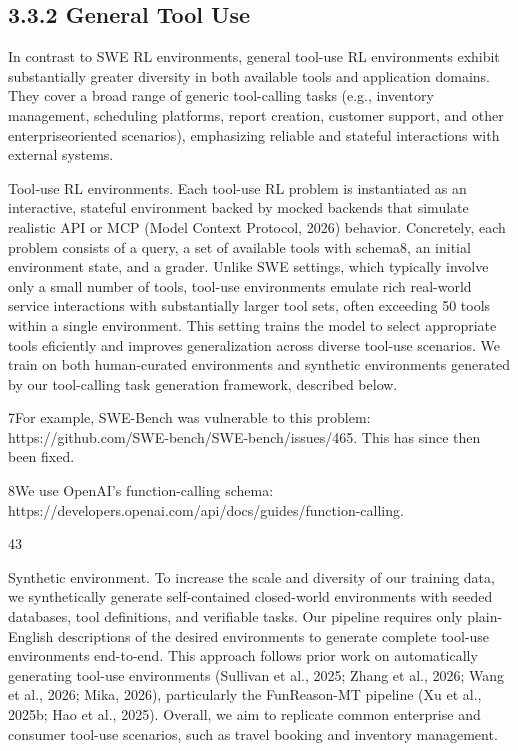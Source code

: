 \documentclass[
  10
]{article}
\begin{document}
\subsection{3.3.2 General Tool Use}\label{general-tool-use}

In contrast to SWE RL environments, general tool-use RL environments
exhibit substantially greater diversity in both available tools and
application domains. They cover a broad range of generic tool-calling
tasks (e.g., inventory management, scheduling platforms, report
creation, customer support, and other enterpriseoriented scenarios),
emphasizing reliable and stateful interactions with external systems.

Tool‐use RL environments. Each tool-use RL problem is instantiated as an
interactive, stateful environment backed by mocked backends that
simulate realistic API or MCP (Model Context Protocol, 2026) behavior.
Concretely, each problem consists of a query, a set of available tools
with schema8, an initial environment state, and a grader. Unlike SWE
settings, which typically involve only a small number of tools, tool-use
environments emulate rich real-world service interactions with
substantially larger tool sets, often exceeding 50 tools within a single
environment. This setting trains the model to select appropriate tools
eficiently and improves generalization across diverse tool-use
scenarios. We train on both human-curated environments and synthetic
environments generated by our tool-calling task generation framework,
described below.

7For example, SWE-Bench was vulnerable to this problem:
https://github.com/SWE-bench/SWE-bench/issues/465. This has since then
been fixed.

8We use OpenAI's function-calling schema:
https://developers.openai.com/api/docs/guides/function-calling.

43

Synthetic environment. To increase the scale and diversity of our
training data, we synthetically generate self-contained closed-world
environments with seeded databases, tool definitions, and verifiable
tasks. Our pipeline requires only plain-English descriptions of the
desired environments to generate complete tool-use environments
end-to-end. This approach follows prior work on automatically generating
tool-use environments (Sullivan et al., 2025; Zhang et al., 2026; Wang
et al., 2026; Mika, 2026), particularly the FunReason-MT pipeline (Xu et
al., 2025b; Hao et al., 2025). Overall, we aim to replicate common
enterprise and consumer tool-use scenarios, such as travel booking and
inventory management.
\end{document}
